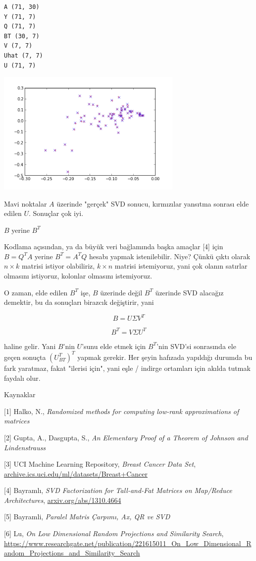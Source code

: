 \documentclass[12pt,fleqn]{article}\usepackage{../../common}
\begin{document}
\begin{verbatim}
A (71, 30)
Y (71, 7)
Q (71, 7)
BT (30, 7)
V (7, 7)
Uhat (7, 7)
U (71, 7)
\end{verbatim}

\includegraphics[height=6cm]{rnd_1.png}

Mavi noktalar $A$ üzerinde "gerçek" SVD sonucu, kırmızılar yansıtma
sonrası elde edilen $U$. Sonuçlar çok iyi. 

$B$ yerine $B^T$

Kodlama açısından, ya da büyük veri bağlamında başka amaçlar [4] için
$B = Q^T A$ yerine $B^T = A^T Q$ hesabı yapmak istenilebilir. Niye?
Çünkü çıktı olarak $n \times k$ matrisi istiyor olabiliriz, $k \times
n$ matrisi istemiyoruz, yani çok olanın satırlar olmasını istiyoruz,
kolonlar olmasını istemiyoruz.

O zaman, elde edilen $B^T$ işe, $B$ üzerinde değil $B^T$ üzerinde SVD
alacağız demektir, bu da sonuçları birazcık değiştirir, yani

$$ B = U\Sigma V^T $$

$$ B^T = V\Sigma U^T $$

haline gelir. Yani $B$'nin $U$'sunu elde etmek için $B^T$'nin SVD'si
sonrasında ele geçen sonuçta $(U_{BT}^T)^T$ yapmak gerekir. Her şeyin
hafızada yapıldığı durumda bu fark yaratmaz, fakat "ilerisi için", yani
eşle / indirge ortamları için akılda tutmak faydalı olur.

Kaynaklar

[1] Halko, N., {\em Randomized methods for computing low-rank approximations of matrices}

[2] Gupta, A., Dasgupta, S., {\em An Elementary Proof of a Theorem of Johnson and Lindenstrauss}

[3] UCI Machine Learning Repository, 
    {\em Breast Cancer Data Set}, 
    \url{archive.ics.uci.edu/ml/datasets/Breast+Cancer}

[4] Bayramlı, {\em SVD Factorization for Tall-and-Fat Matrices on Map/Reduce Architectures}, 
    \url{arxiv.org/abs/1310.4664}

[5] Bayramli, {\em Paralel Matris Çarpımı, Ax, QR ve SVD} 

[6] Lu, {\em On Low Dimensional Random Projections and Similarity Search},
    \url{https://www.researchgate.net/publication/221615011_On_Low_Dimensional_Random_Projections_and_Similarity_Search}
\end{document}
